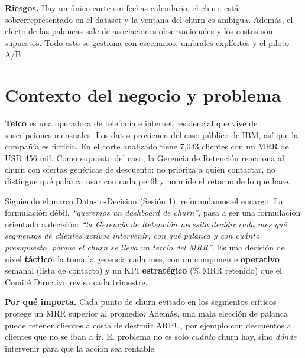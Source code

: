 \documentclass[10.5pt,a4paper]{article}
\begin{document}
\textbf{Riesgos.} Hay un único corte sin fechas calendario, el churn está sobrerrepresentado en el dataset y la ventana del churn es ambigua. Además, el efecto de las palancas sale de asociaciones observacionales y los costos son supuestos. Todo esto se gestiona con escenarios, umbrales explícitos y el piloto A/B.

\section{Contexto del negocio y problema}
\textbf{Telco} es una operadora de telefonía e internet residencial que vive de suscripciones mensuales. Los datos provienen del caso público de IBM, así que la compañía es ficticia. En el corte analizado tiene 7,043 clientes con un MRR de USD 456 mil. Como supuesto del caso, la Gerencia de Retención reacciona al churn con ofertas genéricas de descuento: no prioriza a quién contactar, no distingue qué palanca usar con cada perfil y no mide el retorno de lo que hace.

Siguiendo el marco Data-to-Decision (Sesión 1), reformulamos el encargo. La formulación débil, \emph{``queremos un dashboard de churn''}, pasa a ser una formulación orientada a decisión: \emph{``la Gerencia de Retención necesita decidir cada mes qué segmentos de clientes activos intervenir, con qué palanca y con cuánto presupuesto, porque el churn se lleva un tercio del MRR''}. Es una decisión de nivel \textbf{táctico}: la toma la gerencia cada mes, con un componente \textbf{operativo} semanal (lista de contacto) y un KPI \textbf{estratégico} (\% MRR retenido) que el Comité Directivo revisa cada trimestre.

\textbf{Por qué importa.} Cada punto de churn evitado en los segmentos críticos protege un MRR superior al promedio. Además, una mala elección de palanca puede retener clientes a costa de destruir ARPU, por ejemplo con descuentos a clientes que no se iban a ir. El problema no es solo \emph{cuánto} churn hay, sino \emph{dónde} intervenir para que la acción sea rentable.

\end{document}
